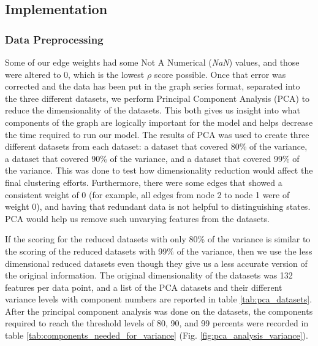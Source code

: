 \subsection{Implementation}
\subsubsection{Data Preprocessing}
Some of our edge weights had some Not A Numerical (\textit{NaN}) values, and those were altered to 0, which is the lowest $\rho$ score possible. Once that error was corrected and the data has been put in the graph series format, separated into the three different datasets, we perform Principal Component Analysis (PCA) to reduce the dimensionality of the datasets. This both gives us insight into what components of the graph are logically important for the model and helps decrease the time required to run our model. The results of PCA was used to create three different datasets from each dataset: a dataset that covered 80\% of the variance, a dataset that covered 90\% of the variance, and a dataset that covered 99\% of the variance. This was done to test how dimensionality reduction would affect the final clustering efforts. Furthermore, there were some edges that showed a consistent weight of 0 (for example, all edges from node 2 to node 1 were of weight 0), and having that redundant data is not helpful to distinguishing states. PCA would help us remove such unvarying features from the datasets.

 If the scoring for the reduced datasets with only 80\% of the variance is similar to the scoring of the reduced datasets with 99\% of the variance, then we use the less dimensional reduced datasets even though they give us a less accurate version of the original information. The original dimensionality of the datasets was 132 features per data point, and a list of the PCA datasets and their different variance levels with component numbers are reported in table \ref{tab:pca_datasets}. After the principal component analysis was done on the datasets, the components required to reach the threshold levels of 80, 90, and 99 percents were recorded in table \ref{tab:components_needed_for_variance} (Fig. \ref{fig:pca_analysis_variance}).


